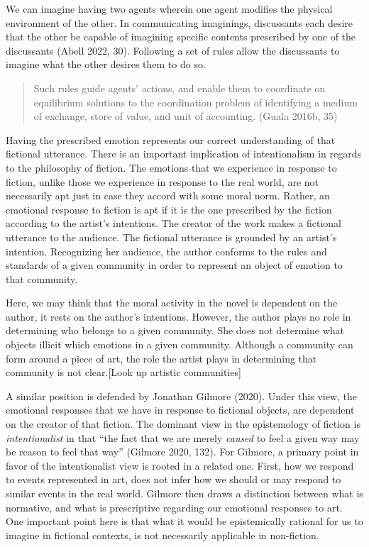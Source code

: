 \documentclass[12pt]{book}
\theoremstyle{definition}
\theoremstyle{remark}
\begin{document}
We can imagine having two agents wherein one agent modifies the physical environment of the other. In communicating imaginings, discussants each desire that the other be capable of imagining specific contents prescribed by one of the discussants (Abell 2022, 30). Following a set of rules allow the discussants to imagine what the other desires them to do so.

\begin{quote}
Such rules guide agents' actions, and enable them to coordinate on equilibrium solutions to the coordination problem of identifying a medium of exchange, store of value, and unit of accounting. (Guala 2016b, 35)
\end{quote}

Having the prescribed emotion represents our correct understanding of that fictional utterance. There is an important implication of intentionalism in regards to the philosophy of fiction. The emotions that we experience in response to fiction, unlike those we experience in response to the real world, are not necessarily apt just in case they accord with some moral norm. Rather, an emotional response to fiction is apt if it is the one prescribed by the fiction according to the artist's intentions. The creator of the work makes a fictional utterance to the audience. The fictional utterance is grounded by an artist's intention. Recognizing her audience, the author conforms to the rules and standards of a given community in order to represent an object of emotion to that community.

Here, we may think that the moral activity in the novel is dependent on the author, it rests on the author's intentions. However, the author plays no role in determining who belongs to a given community. She does not determine what objects illicit which emotions in a given community. Although a community can form around a piece of art, the role the artist plays in determining that community is not clear.{[}Look up artistic communities{]}

A similar position is defended by Jonathan Gilmore (2020). Under this view, the emotional responses that we have in response to fictional objects, are dependent on the creator of that fiction. The dominant view in the epistemology of fiction is \emph{intentionalist} in that ``the fact that we are merely \emph{caused} to feel a given way may be reason to feel that way'' (Gilmore 2020, 132). For Gilmore, a primary point in favor of the intentionalist view is rooted in a related one. First, how we respond to events represented in art, does not infer how we should or may respond to similar events in the real world. Gilmore then draws a distinction between what is normative, and what is prescriptive regarding our emotional responses to art. One important point here is that what it would be epistemically rational for us to imagine in fictional contexts, is not necessarily applicable in non-fiction.
\end{document}
